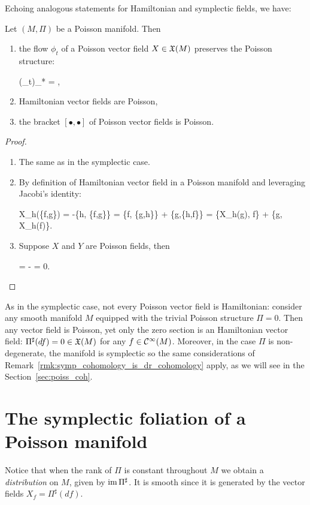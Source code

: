 \documentclass[main.tex]{subfiles}
\begin{document}
Echoing analogous statements for Hamiltonian and symplectic fields, we have:

\begin{theorem}
	Let $(M,\Pi)$ be a Poisson manifold. Then
	\begin{enumerate}
		\item the flow $\phi_t$ of a Poisson vector field $X \in \mathfrak{X}(M)$ preserves the Poisson structure:
		\begin{eqalign}
			(\phi_t)_* \Pi = \Pi,
		\end{eqalign}
		\item Hamiltonian vector fields are Poisson,
		\item the bracket $[\bullet, \bullet]$ of Poisson vector fields is Poisson.
	\end{enumerate}
\end{theorem}
\begin{proof}
	\leavevmode
	\begin{enumerate}
		\item The same as in the symplectic case.
		\item By definition of Hamiltonian vector field in a Poisson manifold and leveraging Jacobi's identity:
		\begin{eqalign}
			X_h(\{f,g\}) = -\{h, \{f,g\}\} = \{f, \{g,h\}\} + \{g,\{h,f\}\} = \{X_h(g), f\} + \{g, X_h(f)\}.
		\end{eqalign}
		\item Suppose $X$ and $Y$ are Poisson fields, then
		\begin{eqalign}
			\Lie{[X,Y]}\Pi = \Lie{Y}\Pi - \Pi = 0.
		\end{eqalign}
	\end{enumerate}
\end{proof}

\begin{remark}
	As in the symplectic case, not every Poisson vector field is Hamiltonian: consider any smooth manifold $M$ equipped with the trivial Poisson structure $\Pi=0$. Then any vector field is Poisson, yet only the zero section is an Hamiltonian vector field: $\Pi^\sharp(df) = 0 \in \mathfrak{X}(M)$ for any $f \in \mathcal{C}^\infty(M)$. Moreover, in the case $\Pi$ is non-degenerate, the manifold is symplectic so the same considerations of Remark~\ref{rmk:symp_cohomology_is_dr_cohomology} apply, as we will see in the Section~\ref{sec:poiss_coh}.
\end{remark}

\section{The symplectic foliation of a Poisson manifold}
Notice that when the rank of $\Pi$ is constant throughout $M$ we obtain a \emph{distribution} on $M$, given by $\operatorname{im} \Pi^\sharp$. It is smooth since it is generated by the vector fields $X_f = \Pi^\sharp (df)$.
\end{document}
